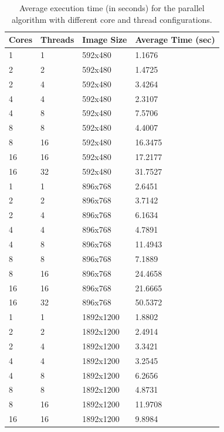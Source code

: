 \documentclass[9pt]{IEEEtran}
\begin{document}
\begin{table}[h]
    \centering
    \caption{Average execution time (in seconds) for the parallel algorithm with different core and thread configurations.}
    \label{tab:parallel}
    \begin{tabular}{|l|l|l|l|}
        \hline
        Cores & Threads & Image Size & Average Time (sec) \\ \hline
        1 & 1 & 592x480 & 1.1676 \\ \hline
        2 & 2 & 592x480 & 1.4725 \\ \hline
        2 & 4 & 592x480 & 3.4264 \\ \hline
        4 & 4 & 592x480 & 2.3107 \\ \hline
        4 & 8 & 592x480 & 7.5706 \\ \hline
        8 & 8 & 592x480 & 4.4007 \\ \hline
        8 & 16 & 592x480 & 16.3475 \\ \hline
        16 & 16 & 592x480 & 17.2177 \\ \hline
        16 & 32 & 592x480 & 31.7527 \\ \hline
        1 & 1 & 896x768 & 2.6451 \\ \hline
        2 & 2 & 896x768 & 3.7142 \\ \hline
        2 & 4 & 896x768 & 6.1634 \\ \hline
        4 & 4 & 896x768 & 4.7891 \\ \hline
        4 & 8 & 896x768 & 11.4943 \\ \hline
        8 & 8 & 896x768 & 7.1889 \\ \hline
        8 & 16 & 896x768 & 24.4658 \\ \hline
        16 & 16 & 896x768 & 21.6665 \\ \hline
        16 & 32 & 896x768 & 50.5372 \\ \hline
        1 & 1 & 1892x1200 & 1.8802 \\ \hline
        2 & 2 & 1892x1200 & 2.4914 \\ \hline
        2 & 4 & 1892x1200 & 3.3421 \\ \hline
        4 & 4 & 1892x1200 & 3.2545 \\ \hline
        4 & 8 & 1892x1200 & 6.2656 \\ \hline
        8 & 8 & 1892x1200 & 4.8731 \\ \hline
        8 & 16 & 1892x1200 & 11.9708 \\ \hline
        16 & 16 & 1892x1200 & 9.8984 \\ \hline

\end{tabular}
\end{table}
\end{document}
